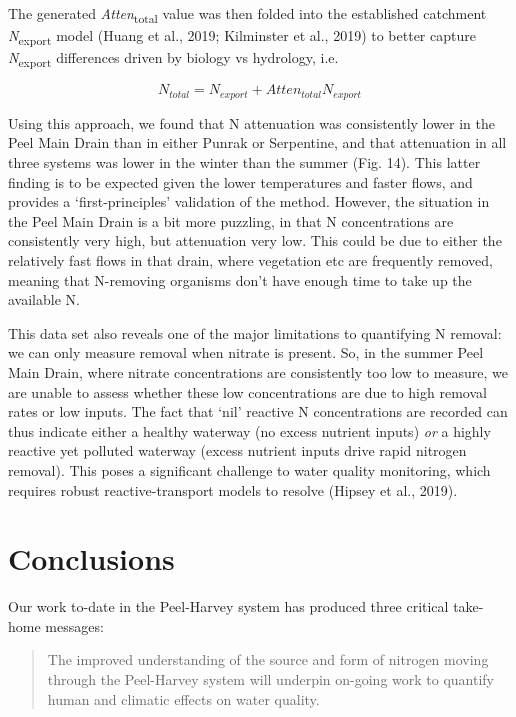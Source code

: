 \documentclass[
]{book}
\begin{document}
The generated \emph{Atten}\textsubscript{total} value was then folded into the established catchment \emph{N}\textsubscript{export} model (Huang et al., 2019; Kilminster et al., 2019) to better capture \emph{N}\textsubscript{export} differences driven by biology vs hydrology, i.e.~

\[
N_{total} = N_{export} + Atten_{total} N_{export}
\]

Using this approach, we found that N attenuation was consistently lower in the Peel Main Drain than in either Punrak or Serpentine, and that attenuation in all three systems was lower in the winter than the summer (Fig. 14). This latter finding is to be expected given the lower temperatures and faster flows, and provides a `first-principles' validation of the method. However, the situation in the Peel Main Drain is a bit more puzzling, in that N concentrations are consistently very high, but attenuation very low. This could be due to either the relatively fast flows in that drain, where vegetation etc are frequently removed, meaning that N-removing organisms don't have enough time to take up the available N.~

This data set also reveals one of the major limitations to quantifying N removal: we can only measure removal when nitrate is present. So, in the summer Peel Main Drain, where nitrate concentrations are consistently too low to measure, we are unable to assess whether these low concentrations are due to high removal rates or low inputs. The fact that `nil' reactive N concentrations are recorded can thus indicate either a healthy waterway (no excess nutrient inputs) \emph{or} a highly reactive yet polluted waterway (excess nutrient inputs drive rapid nitrogen removal). This poses a significant challenge to water quality monitoring, which requires robust reactive-transport models to resolve (Hipsey et al., 2019).~

\hypertarget{conclusions-4}{%
\section{Conclusions}\label{conclusions-4}}

Our work to-date in the Peel-Harvey system has produced three critical take-home messages:

\begin{quote}
The improved understanding of the source and form of nitrogen moving through the Peel-Harvey system will underpin on-going work to quantify human and climatic effects on water quality.
\end{quote}
\end{document}
